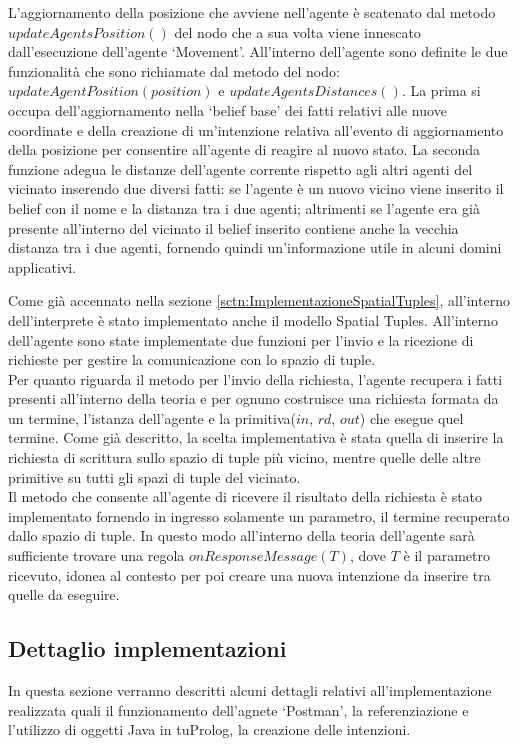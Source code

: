 L'aggiornamento della posizione che avviene nell'agente è scatenato dal metodo $updateAgentsPosition()$ del nodo che a sua volta viene innescato dall'esecuzione dell'agente `Movement'. All'interno dell'agente sono definite le due funzionalità che sono richiamate dal metodo del nodo: $updateAgentPosition(position)$ e $updateAgentsDistances()$. La prima si occupa dell'aggiornamento nella `belief base' dei fatti relativi alle nuove coordinate e della creazione di un'intenzione relativa all'evento di aggiornamento della posizione per consentire all'agente di reagire al nuovo stato.
La seconda funzione adegua le distanze dell'agente corrente rispetto agli altri agenti del vicinato inserendo due diversi fatti: se l'agente è un nuovo vicino viene inserito il belief con il nome e la distanza tra i due agenti; altrimenti se l'agente era già presente all'interno del vicinato il belief inserito contiene anche la vecchia distanza tra i due agenti, fornendo quindi un'informazione utile in alcuni domini applicativi.

Come già accennato nella sezione \ref{sctn:ImplementazioneSpatialTuples}, all'interno dell'interprete è stato implementato anche il modello Spatial Tuples.
All'interno dell'agente sono state implementate due funzioni per l'invio e la ricezione di richieste per gestire la comunicazione con lo spazio di tuple.
\\
Per quanto riguarda il metodo per l'invio della richiesta, l'agente recupera i fatti presenti all'interno della teoria e per ognuno costruisce una richiesta formata da un termine, l'istanza dell'agente e la primitiva($in$, $rd$, $out$) che esegue quel termine. Come già descritto, la scelta implementativa è stata quella di inserire la richiesta di scrittura sullo spazio di tuple più vicino, mentre quelle delle altre primitive su tutti gli spazi di tuple del vicinato.
\\
Il metodo che consente all'agente di ricevere il risultato della richiesta è stato implementato fornendo in ingresso solamente un parametro, il termine recuperato dallo spazio di tuple. In questo modo all'interno della teoria dell'agente sarà sufficiente trovare una regola $onResponseMessage(T)$, dove $T$ è il parametro ricevuto, idonea al contesto per poi creare una nuova intenzione da inserire tra quelle da eseguire.

\subsection{Dettaglio implementazioni}\label{sctn:DettaglioImplementazioni}
In questa sezione verranno descritti alcuni dettagli relativi all'implementazione realizzata quali il funzionamento dell'agnete `Postman', la referenziazione e l'utilizzo di oggetti Java in tuProlog, la creazione delle intenzioni.

